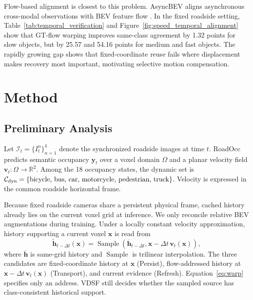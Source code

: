\documentclass{article}
\begin{document}
Flow-based alignment is closest to this problem. AsyncBEV aligns asynchronous
cross-modal observations with BEV feature flow \citep{AsyncBEV}. In the fixed
roadside setting, Table~\ref{tab:temporal_verification} and
Figure~\ref{fig:speed_temporal_alignment} show that GT-flow warping improves
same-class agreement by 1.32 points for slow objects, but by 25.57 and
54.16 points for medium and fast objects. The rapidly growing gap shows that
fixed-coordinate reuse fails where displacement makes recovery most important, motivating
selective motion compensation.


\section{Method}
\label{sec:method}

\subsection{Preliminary Analysis}

Let $\mathcal I_t=\{I_t^n\}_{n=1}^{4}$ denote the synchronized roadside images
at time $t$. RoadOcc predicts semantic occupancy $\mathbf y_t$ over a voxel
domain $\Omega$ and a planar velocity field
$\mathbf v_t:\Omega\rightarrow\mathbb R^2$. Among the 18 occupancy states, the
dynamic set is $\mathcal C_{\rm dyn}=\{\text{bicycle, bus, car, motorcycle,
pedestrian, truck}\}$. Velocity is expressed in the common roadside horizontal
frame.

Because fixed roadside cameras share a persistent physical frame, cached
history already lies on the current voxel grid at inference. We only reconcile
relative BEV augmentations during training. Under a locally constant velocity
approximation, history supporting a current voxel
$\mathbf x$ is read from
\begin{equation}
  \widetilde{\mathbf h}_{t-\Delta t}(\mathbf x)=
  \operatorname{Sample}\!\left(\overline{\mathbf h}_{t-\Delta t},
  \mathbf x-\Delta t\,\mathbf v_t(\mathbf x)\right),
  \label{eq:warp}
\end{equation}
where $\overline{\mathbf h}$ is same-grid history and
$\operatorname{Sample}$ is trilinear interpolation. The three candidates are
fixed-coordinate history at $\mathbf x$ (Persist), flow-addressed history at
$\mathbf x-\Delta t\,\mathbf v_t(\mathbf x)$ (Transport), and current evidence
(Refresh). Equation~\ref{eq:warp} specifies only an address. VDSF still decides
whether the sampled source has class-consistent historical support.
\end{document}
